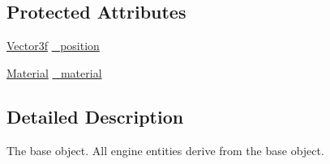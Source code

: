 \subsection*{Protected Attributes}
\begin{DoxyCompactItemize}
\item 
\hyperlink{group___math_gadb6fa781064c3c3c9b13eb984adae162}{Vector3f} \hyperlink{class_race_tray_1_1_object_afc27cf33104f6af734684534e3230723}{\-\_\-position}
\item 
\hyperlink{class_race_tray_1_1_material}{Material} \hyperlink{class_race_tray_1_1_object_a659c1956bd811a2cc687fd899f3aa0e0}{\-\_\-material}
\end{DoxyCompactItemize}


\subsection{Detailed Description}
The base object. All engine entities derive from the base object. 

